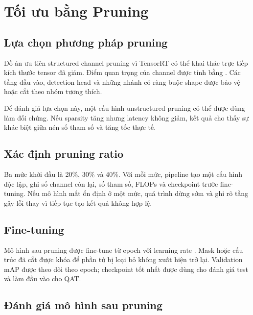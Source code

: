 \section{Tối ưu bằng Pruning}

\subsection{Lựa chọn phương pháp pruning}

Đồ án ưu tiên structured channel pruning vì TensorRT có thể khai thác trực tiếp
kích thước tensor đã giảm. Điểm quan trọng của channel được tính bằng
. Các tầng đầu vào, detection head
và những nhánh có ràng buộc shape được bảo vệ hoặc cắt theo nhóm tương thích.

Để đánh giá lựa chọn này, một cấu hình unstructured pruning có thể được dùng làm
đối chứng. Nếu sparsity tăng nhưng latency không giảm, kết quả cho thấy sự khác
biệt giữa nén số tham số và tăng tốc thực tế.

\subsection{Xác định pruning ratio}

Ba mức khởi đầu là 20\%, 30\% và 40\%. Với mỗi mức, pipeline tạo một cấu hình
độc lập, ghi số channel còn lại, số tham số, FLOPs và checkpoint trước fine-tuning.
Nếu mô hình mất ổn định ở một mức, quá trình dừng sớm và ghi rõ tầng gây lỗi thay
vì tiếp tục tạo kết quả không hợp lệ.

\subsection{Fine-tuning}

Mô hình sau pruning được fine-tune từ  epoch với learning rate
. Mask hoặc cấu trúc đã cắt được khóa để phần tử bị loại bỏ không
xuất hiện trở lại. Validation mAP được theo dõi theo epoch; checkpoint tốt nhất
được dùng cho đánh giá test và làm đầu vào cho QAT.

\subsection{Đánh giá mô hình sau pruning}

